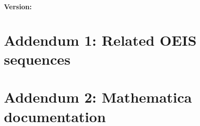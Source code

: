 \documentclass[12pt,letterpaper,oneside,reqno]{amsart}
\numberwithin{equation}{section}
\begin{document}
    
    
    \noindent \textbf{Version:} 


    \section{Addendum 1: Related OEIS sequences}\label{sec:related-oeis-sequences}
    


    \section{Addendum 2: Mathematica documentation}\label{sec:mathematica-documentation}
    
\end{document}
